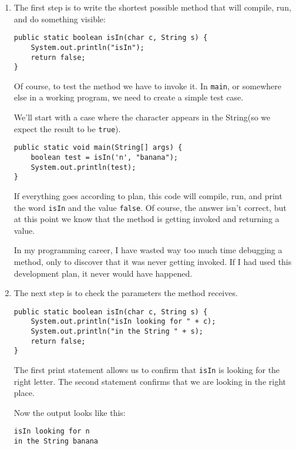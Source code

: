 \documentclass{book}
\begin{document}
\begin{enumerate}

\item The first step is to write the shortest possible method
that will compile, run, and do something visible:

\begin{verbatim}
public static boolean isIn(char c, String s) {
    System.out.println("isIn");
    return false;
}
\end{verbatim}

Of course, to test the method we have to invoke it.  In
{\tt main}, or somewhere else in a working program, we need
to create a simple test case.

We'll start with a case where the character appears in the
String(so we expect the result to be {\tt true}).

\begin{verbatim}
public static void main(String[] args) {
    boolean test = isIn('n', "banana");
    System.out.println(test);
}
\end{verbatim}

If everything goes according to plan, this code will compile,
run, and print the word {\tt isIn} and the value {\tt false}.
Of course, the answer isn't correct, but at this point we know
that the method is getting invoked and returning a value.

In my programming career, I have wasted way too much time debugging
a method, only to discover that it was never getting invoked.
If I had used this development plan, it never would have happened.

\item The next step is to check the parameters the method
receives.

\begin{verbatim}
public static boolean isIn(char c, String s) {
    System.out.println("isIn looking for " + c);
    System.out.println("in the String " + s);
    return false;
}
\end{verbatim}

The first print statement allows us to confirm that {\tt isIn}
is looking for the right letter.  The second statement confirms
that we are looking in the right place.

Now the output looks like this:

\begin{verbatim}
isIn looking for n
in the String banana
\end{verbatim}


\end{enumerate}
\end{document}
